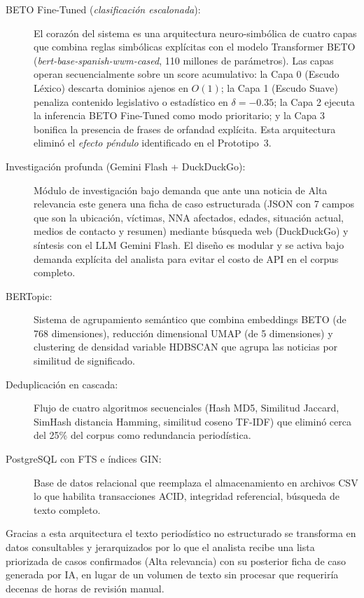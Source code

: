 \begin{description}
    \item[BETO Fine-Tuned (\textit{clasificación escalonada}):] El corazón del sistema es una
    arquitectura neuro-simbólica de cuatro capas que combina reglas simbólicas explícitas con el
    modelo Transformer BETO (\textit{bert-base-spanish-wwm-cased}, 110 millones de parámetros).
    Las capas operan secuencialmente sobre un score acumulativo: la Capa 0 (Escudo Léxico) descarta
    dominios ajenos en $O(1)$; la Capa 1 (Escudo Suave) penaliza contenido legislativo o estadístico
    en $\delta = -0.35$; la Capa 2 ejecuta la inferencia BETO Fine-Tuned como modo prioritario; y la
    Capa 3 bonifica la presencia de frases de orfandad explícita. Esta arquitectura eliminó el
    \textit{efecto péndulo} identificado en el Prototipo~3.

    \item[Investigación profunda (Gemini Flash + DuckDuckGo):] Módulo de investigación bajo
    demanda que ante una noticia de Alta relevancia este genera una ficha de caso
    estructurada (JSON con 7 campos que son la ubicación, víctimas, NNA afectados, edades, situación actual,
    medios de contacto y resumen) mediante búsqueda web (DuckDuckGo) y síntesis con el LLM Gemini Flash.
    El diseño es modular y se activa bajo demanda explícita del analista para evitar el costo de API en el corpus completo.

    \item[BERTopic:] Sistema de agrupamiento semántico que combina embeddings BETO
    (de 768 dimensiones), reducción dimensional UMAP (de 5 dimensiones) y clustering de densidad
    variable HDBSCAN que agrupa las noticias por similitud de significado.

    \item[Deduplicación en cascada:] Flujo de cuatro algoritmos secuenciales (Hash MD5,
    Similitud Jaccard, SimHash distancia Hamming, similitud coseno TF-IDF) que eliminó cerca del 25\%
    del corpus como redundancia periodística.

    \item[PostgreSQL con FTS e índices GIN:] Base de datos relacional que reemplaza el
    almacenamiento en archivos CSV lo que habilita transacciones ACID, integridad referencial,
    búsqueda de texto completo.
\end{description}

Gracias a esta arquitectura el texto periodístico no estructurado se transforma en datos
consultables y jerarquizados por lo que el analista recibe una lista priorizada de casos
confirmados (Alta relevancia) con su posterior ficha de caso generada por IA, en lugar de
un volumen de texto sin procesar que requeriría decenas de horas de revisión manual.


